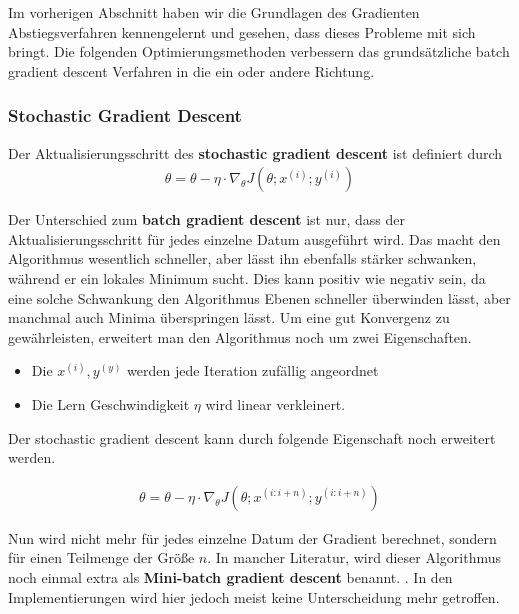 Im vorherigen Abschnitt haben wir die Grundlagen des Gradienten Abstiegsverfahren
kennengelernt und gesehen, dass dieses Probleme mit sich bringt. Die folgenden
Optimierungsmethoden verbessern das grundsätzliche batch gradient descent Verfahren
in die ein oder andere Richtung.


\subsubsection{Stochastic Gradient Descent}\label{Stochastic Gradient Descent}

\begin{definition}
    \cite[Kapitel 2.2]{Ruder.9152016}
    Der Aktualisierungsschritt des \textbf{stochastic gradient descent} ist definiert durch 
    \begin{align}
        \theta = \theta - \eta \cdot \nabla_\theta J(\theta;x^{(i)};y^{(i)})
    \end{align}
\end{definition}

Der Unterschied zum \textbf{batch gradient descent} ist nur, dass der Aktualisierungsschritt
für jedes einzelne Datum ausgeführt wird. Das macht den 
Algorithmus wesentlich schneller, aber lässt ihn ebenfalls 
stärker schwanken, während er ein lokales Minimum sucht. Dies kann
positiv wie negativ sein, da eine solche Schwankung 
den Algorithmus Ebenen schneller überwinden lässt, aber manchmal
auch Minima überspringen lässt. Um eine gut Konvergenz zu gewährleisten,
erweitert man den Algorithmus noch um zwei Eigenschaften.

\begin{itemize}
    \item Die $x^{(i)}, y^{(y)}$ werden jede Iteration zufällig angeordnet
    \item Die Lern Geschwindigkeit $\eta$ wird linear verkleinert. 
\end{itemize}

Der stochastic gradient descent kann durch folgende Eigenschaft noch 
erweitert werden.

\begin{align}
    \theta = \theta - \eta \cdot \nabla_\theta J(\theta;x^{(i:i+n)};y^{(i:i+n)})
\end{align}

Nun wird nicht mehr für jedes einzelne Datum der Gradient berechnet, sondern
für einen Teilmenge der Größe $n$. In mancher Literatur, wird 
dieser Algorithmus noch einmal extra als \textbf{Mini-batch gradient descent} benannt.
\cite[Kapitel 2.3]{Ruder.9152016}. In den Implementierungen wird hier jedoch meist 
keine Unterscheidung mehr getroffen. \cite{chollet2015keras}

